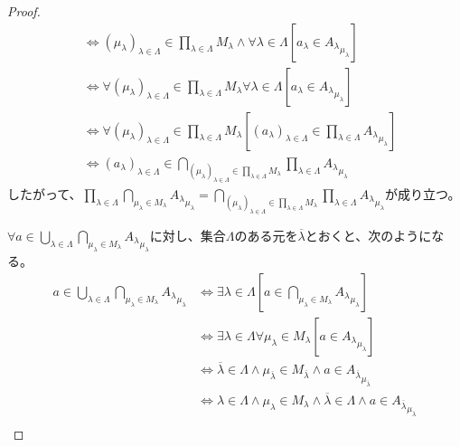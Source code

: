 \documentclass[a4paper]{jsarticle}
\begin{document}
\begin{proof}
\begin{align*}
&\Leftrightarrow \left( \mu_{\lambda} \right)_{\lambda \in \varLambda} \in \prod_{\lambda \in \varLambda} M_{\lambda} \land \forall\lambda \in \varLambda\left[ a_{\lambda} \in {A_{\lambda}}_{\mu_{\lambda}} \right]\\
&\Leftrightarrow \forall\left( \mu_{\lambda} \right)_{\lambda \in \varLambda} \in \prod_{\lambda \in \varLambda} M_{\lambda}\forall\lambda \in \varLambda\left[ a_{\lambda} \in {A_{\lambda}}_{\mu_{\lambda}} \right]\\
&\Leftrightarrow \forall\left( \mu_{\lambda} \right)_{\lambda \in \varLambda} \in \prod_{\lambda \in \varLambda} M_{\lambda}\left[ \left( a_{\lambda} \right)_{\lambda \in \varLambda} \in \prod_{\lambda \in \varLambda} {A_{\lambda}}_{\mu_{\lambda}} \right]\\
&\Leftrightarrow \left( a_{\lambda} \right)_{\lambda \in \varLambda} \in \bigcap_{\left( \mu_{\lambda} \right)_{\lambda \in \varLambda} \in \prod_{\lambda \in \varLambda} M_{\lambda}} {\prod_{\lambda \in \varLambda} {A_{\lambda}}_{\mu_{\lambda}}}
\end{align*}
したがって、$\prod_{\lambda \in \varLambda} {\bigcap_{\mu_{\lambda} \in M_{\lambda}} {A_{\lambda}}_{\mu_{\lambda}}} = \bigcap_{\left( \mu_{\lambda} \right)_{\lambda \in \varLambda} \in \prod_{\lambda \in \varLambda} M_{\lambda}} {\prod_{\lambda \in \varLambda} {A_{\lambda}}_{\mu_{\lambda}}}$が成り立つ。\par
$\forall a \in \bigcup_{\lambda \in \varLambda} {\bigcap_{\mu_{\lambda} \in M_{\lambda}} {A_{\lambda}}_{\mu_{\lambda}}}$に対し、集合$\varLambda$のある元を$\overline{\lambda}$とおくと、次のようになる。
\begin{align*}
a \in \bigcup_{\lambda \in \varLambda} {\bigcap_{\mu_{\lambda} \in M_{\lambda}} {A_{\lambda}}_{\mu_{\lambda}}} &\Leftrightarrow \exists\lambda \in \varLambda\left[ a \in \bigcap_{\mu_{\lambda} \in M_{\lambda}} {A_{\lambda}}_{\mu_{\lambda}} \right]\\
&\Leftrightarrow \exists\lambda \in \varLambda\forall\mu_{\lambda} \in M_{\lambda}\left[ a \in {A_{\lambda}}_{\mu_{\lambda}} \right]\\
&\Leftrightarrow \overline{\lambda} \in \varLambda \land \mu_{\overline{\lambda}} \in M_{\overline{\lambda}} \land a \in {A_{\overline{\lambda}}}_{\mu_{\overline{\lambda}}}\\
&\Leftrightarrow \lambda \in \varLambda \land \mu_{\lambda} \in M_{\lambda} \land \overline{\lambda} \in \varLambda \land a \in {A_{\overline{\lambda}}}_{\mu_{\overline{\lambda}}}\\

\end{align*}
\end{proof}
\end{document}
